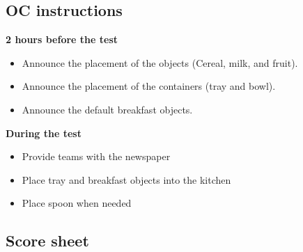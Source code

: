 \subsection{OC instructions}

\textbf{2 hours before the test}
\begin{itemize}
	\item Announce the placement of the objects (Cereal, milk, and fruit).
	\item Announce the placement of the containers (tray and bowl).
	\item Announce the default breakfast objects.
\end{itemize}

\textbf{During the test}
\begin{itemize}
	\item Provide teams with the newspaper
	\item Place tray and breakfast objects into the kitchen
	\item Place spoon when needed
\end{itemize}

\newpage

\subsection{Score sheet}


